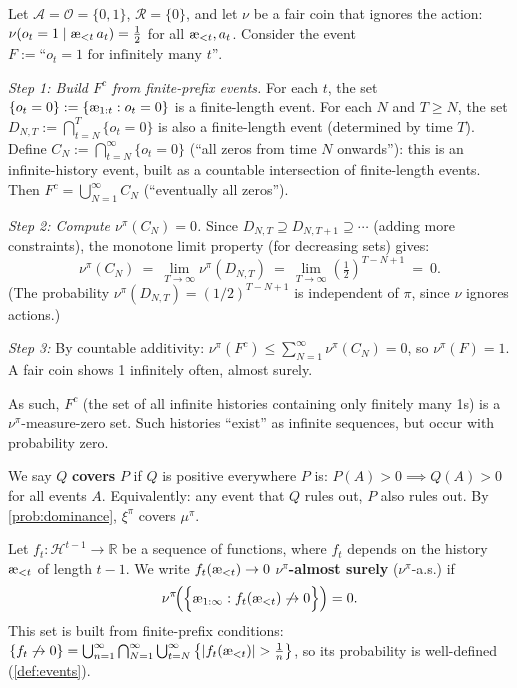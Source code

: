\documentclass[fontsize=11pt, parskip=half]{scrartcl}
\newcommand{\cA}{\mathcal{A}}
\newcommand{\cO}{\mathcal{O}}
\newcommand{\cR}{\mathcal{R}}
\newcommand{\cH}{\mathcal{H}}
\newcommand{\aes}{\textnormal{\ae}}
\begin{document}
\begin{example}
Let $\cA = \cO = \{0,1\}$, $\cR = \{0\}$, and let $\nu$ be a fair coin that ignores the action: $\nu(o_t = 1 \mid \aes_{<t}\, a_t) = \tfrac{1}{2}$ for all $\aes_{<t}, a_t$.
Consider the event $F := \text{``}o_t = 1\text{ for infinitely many } t\text{''}$.

\medskip
\emph{Step 1: Build $F^c$ from finite-prefix events.}
For each $t$, the set $\{o_t = 0\} := \{\aes_{1:t} : o_t = 0\}$ is a finite-length event.
For each $N$ and $T \geq N$, the set $D_{N,T} := \bigcap_{t=N}^{T} \{o_t = 0\}$ is also a finite-length event (determined by time $T$).
Define $C_N := \bigcap_{t=N}^{\infty} \{o_t = 0\}$ (``all zeros from time $N$ onwards''): this is an infinite-history event, built as a countable intersection of finite-length events.
Then $F^c = \bigcup_{N=1}^\infty C_N$ (``eventually all zeros'').

\medskip
\emph{Step 2: Compute $\nu^\pi(C_N) = 0$.}
Since $D_{N,T} \supseteq D_{N,T+1} \supseteq \cdots$ (adding more constraints), the monotone limit property (for decreasing sets) gives:
\[
    \nu^\pi(C_N)
    ~=~ \lim_{T \to \infty} \nu^\pi(D_{N,T})
    ~=~ \lim_{T \to \infty} \left(\tfrac{1}{2}\right)^{T - N + 1}
    ~=~ 0.
\]
(The probability $\nu^\pi(D_{N,T}) = (1/2)^{T-N+1}$ is independent of $\pi$, since $\nu$ ignores actions.)

\medskip
\emph{Step 3:}
By countable additivity: $\nu^\pi(F^c) \leq \sum_{N=1}^\infty \nu^\pi(C_N) = 0$, so $\nu^\pi(F) = 1$.
A fair coin shows 1 infinitely often, almost surely.

As such, $F^c$ (the set of all infinite histories containing only finitely many 1s) is a $\nu^\pi$-measure-zero set. Such histories ``exist'' as infinite sequences, but occur with probability zero.
\end{example}

\begin{definition}\label{def:covering}
We say $Q$ \textbf{covers} $P$ if $Q$ is positive everywhere $P$ is:
$P(A) > 0 \implies Q(A) > 0$ for all events $A$.
Equivalently: any event that $Q$ rules out, $P$ also rules out.
By \cref{prob:dominance}, $\xi^\pi$ covers $\mu^\pi$.
\end{definition}

\begin{definition}\label{def:as}
Let $f_t : \cH^{t-1} \to \mathbb{R}$ be a sequence of functions, where $f_t$ depends on the history $\aes_{<t}$ of length $t-1$. We write $f_t(\aes_{<t}) \to 0$ $\nu^\pi$\textbf{-almost surely} ($\nu^\pi$-a.s.) if
\[
    \nu^\pi\!\Big(\Big\{\aes_{1:\infty} : f_t(\aes_{<t}) \not\to 0\Big\}\Big) = 0.
\]
This set is built from finite-prefix conditions:
$\{f_t \not\to 0\} = \bigcup_{n=1}^\infty \bigcap_{N=1}^\infty \bigcup_{t=N}^\infty \big\{|f_t(\aes_{<t})| > \tfrac{1}{n}\big\}$,
so its probability is well-defined (\cref{def:events}).
\end{definition}
\end{document}
